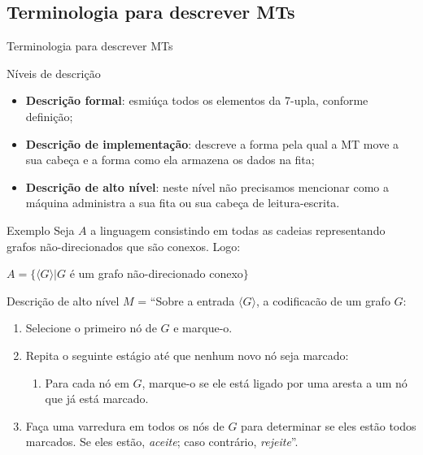 \documentclass[xcolor=dvipsnames,table]{beamer}
\begin{document}
	\subsection{Terminologia para descrever MTs}
	\begin{frame}{Terminologia para descrever MTs}
		\begin{block}{Níveis de descrição}
			\begin{itemize}
				\item<1,4> {\bf Descrição formal}: esmiúça todos os elementos da 7-upla, conforme definição;
				\item<2,4> {\bf Descrição de implementação}: descreve a forma pela qual a MT move a sua cabeça e a forma como ela armazena os dados na fita;
				\item<3,4> {\bf Descrição de alto nível}: neste nível não precisamos mencionar como a máquina administra a sua fita ou sua cabeça de leitura-escrita.
			\end{itemize}
		\end{block}
	\end{frame}
	
	\begin{frame}[shrink]{Exemplo}
		Seja $A$ a linguagem consistindo em todas as cadeias representando grafos não-direcionados que são conexos. Logo:
		\begin{center}
			$A = \{\langle G \rangle | G$ é um grafo não-direcionado conexo$\}$
		\end{center}\pause		
		\begin{block}{Descrição de alto nível}
			$M$ = ``Sobre a entrada $\langle G \rangle$, a codificacão de um grafo $G$:
			\begin{enumerate}
				\item Selecione o primeiro nó de $G$ e marque-o.
				\item Repita o seguinte estágio até que nenhum novo nó seja marcado:
					\begin{enumerate}
						\item Para cada nó em $G$, marque-o se ele está ligado por uma aresta a um nó que já está marcado.
					\end{enumerate}
				\item Faça uma varredura em todos os nós de $G$ para determinar se eles estão todos marcados. Se eles estão, {\it aceite}; caso contrário, {\it rejeite}''.
			\end{enumerate}
		\end{block}
	\end{frame}
	
\end{document}
